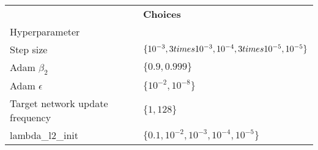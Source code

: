 \begin{tabular}{ll}
 & \bfseries Choices \\
Hyperparameter &  \\
Step size & $\{10^{-3}, 3 \\times 10^{-3}, 10^{-4}, 3 \\times 10^{-5}, 10^{-5}\}$ \\
Adam $\beta_2$ & $\{0.9, 0.999\}$ \\
Adam $\epsilon$ & $\{10^{-2}, 10^{-8}\}$ \\
Target network update frequency & $\{1, 128\}$ \\
lambda_l2_init & $\{0.1, 10^{-2}, 10^{-3}, 10^{-4}, 10^{-5}\}$ \\
\end{tabular}
